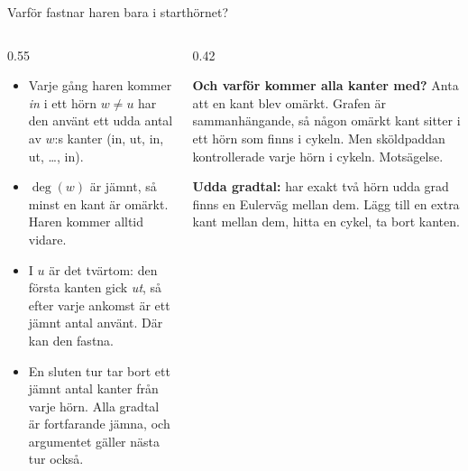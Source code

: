 {\kaninbg
\begin{frame}{\kh Varför fastnar haren bara i starthörnet?}
\begin{columns}[T]
\begin{column}{0.55\textwidth}
\small
\begin{itemize}\setlength{\itemsep}{3pt}
  \item Varje gång haren kommer \emph{in} i ett hörn $w\neq u$ har den använt ett udda antal
        av $w$:s kanter (in, ut, in, ut, \dots, in).
  \item $\deg(w)$ är jämnt, så minst en kant är omärkt. Haren kommer alltid vidare.
  \item I $u$ är det tvärtom: den första kanten gick \emph{ut}, så efter varje ankomst är ett
        jämnt antal använt. Där kan den fastna.
  \item En sluten tur tar bort ett jämnt antal kanter från varje hörn. Alla gradtal är
        fortfarande jämna, och argumentet gäller nästa tur också.
\end{itemize}
\end{column}
\begin{column}{0.42\textwidth}
\begin{kaninbox}[fontupper=\footnotesize]
\textbf{Och varför kommer alla kanter med?} Anta att en kant blev omärkt. Grafen är
sammanhängande, så någon omärkt kant sitter i ett hörn som finns i cykeln. Men sköldpaddan
kontrollerade varje hörn i cykeln. Motsägelse.
\end{kaninbox}
\begin{kaninbox}[fontupper=\footnotesize]
\textbf{Udda gradtal:} har exakt två hörn udda grad finns en Eulerväg mellan dem. Lägg till
en extra kant mellan dem, hitta en cykel, ta bort kanten.
\end{kaninbox}
\end{column}
\end{columns}
\end{frame}}

